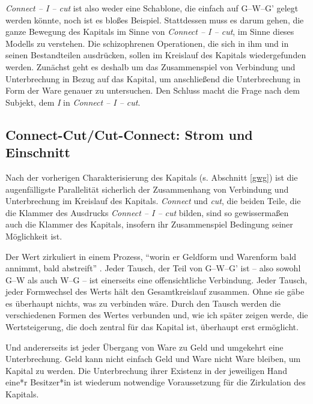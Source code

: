 \documentclass[12pt,
               paper=a4,
               twoside=false,
               onehalfspacing,
               bibliography=totoc,
               toc=graduated,
               ]{scrartcl}
\newcommand{\pc}[2]{\parencite[#1]{#2}}
\newcommand{\worries}[1]{\ifdraft{\textcolor{blue}{\texttt{(#1)}}}{}}
\newcommand{\gwg}{G--W--G'\xspace}
\newcommand{\cic}{Connect -- I -- cut\xspace}
\begin{document}
\emph{\cic} ist also weder eine Schablone, die einfach auf \gwg gelegt
werden könnte, noch ist es bloßes Beispiel. Stattdessen muss es darum
gehen, die ganze Bewegung des Kapitals im Sinne von \emph{\cic}, im
Sinne dieses Modells zu verstehen. Die schizophrenen Operationen, die
sich in ihm und in seinen Bestandteilen ausdrücken, sollen im
Kreislauf des Kapitals wiedergefunden werden. Zunächst geht es deshalb
um das Zusammenspiel von Verbindung und Unterbrechung in Bezug auf das
Kapital, um anschließend die Unterbrechung in Form der Ware genauer zu
untersuchen. Den Schluss macht die Frage nach dem Subjekt, dem
\emph{I} in \emph{\cic}.



\subsection{Connect-Cut/Cut-Connect: Strom und Einschnitt}


Nach der vorherigen Charakterisierung des Kapitals (s. Abschnitt
\ref{gwg}) ist die augenfälligste Parallelität sicherlich der
Zusammenhang von Verbindung und Unterbrechung im Kreislauf des
Kapitals. \emph{Connect} und \emph{cut}, die beiden Teile, die die
Klammer des Ausdrucks \emph{\cic} bilden, sind so gewissermaßen auch
die Klammer des Kapitals, insofern ihr Zusammenspiel Bedingung seiner
Möglichkeit ist.


Der Wert zirkuliert in einem Prozess, "`worin er Geldform und
Warenform bald annimmt, bald abstreift"' \pc{169}{kap}. Jeder Tausch,
der Teil von \gwg ist -- also sowohl G--W als auch W--G -- ist
einerseits eine offensichtliche Verbindung. Jeder Tausch, jeder
Formwechsel des Werts hält den Gesamtkreislauf zusammen. Ohne sie gäbe
es überhaupt nichts, was zu verbinden wäre. Durch den Tausch werden
die verschiedenen Formen des Wertes verbunden und, wie ich später
zeigen werde, die Wertsteigerung, die doch zentral für das Kapital
ist, überhaupt erst ermöglicht.


Und andererseits ist jeder Übergang von Ware zu Geld und umgekehrt
eine Unterbrechung. Geld kann nicht einfach Geld und Ware nicht Ware
bleiben, um Kapital zu werden. Die Unterbrechung ihrer Existenz in der
jeweiligen Hand eine*r Besitzer*in ist wiederum notwendige
Voraussetzung für die Zirkulation des Kapitals.
\end{document}
